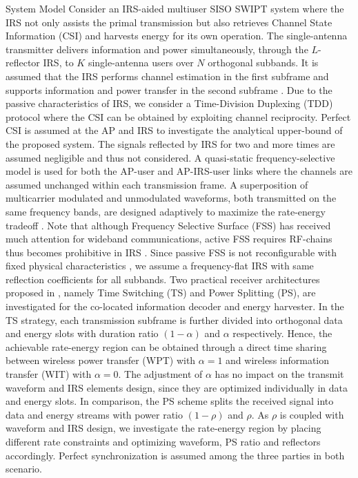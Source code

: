 \documentclass{IEEEtran}
\begin{document}
\begin{section}{System Model}
	Consider an IRS-aided multiuser SISO SWIPT system where the IRS not only assists the primal transmission but also retrieves Channel State Information (CSI) and harvests energy for its own operation. The single-antenna transmitter delivers information and power simultaneously, through the $L$-reflector IRS, to $K$ single-antenna users over $N$ orthogonal subbands. It is assumed that the IRS performs channel estimation in the first subframe and supports information and power transfer in the second subframe \cite{Zheng2019}. Due to the passive characteristics of IRS, we consider a Time-Division Duplexing (TDD) protocol where the CSI can be obtained by exploiting channel reciprocity. Perfect CSI is assumed at the AP and IRS to investigate the analytical upper-bound of the proposed system. The signals reflected by IRS for two and more times are assumed negligible and thus not considered. A quasi-static frequency-selective model is used for both the AP-user and AP-IRS-user links where the channels are assumed unchanged within each transmission frame. A superposition of multicarrier modulated and unmodulated waveforms, both transmitted on the same frequency bands, are designed adaptively to maximize the rate-energy tradeoff \cite{Clerckx2018b}. Note that although Frequency Selective Surface (FSS) has received much attention for wideband communications, active FSS requires RF-chains thus becomes prohibitive in IRS \cite{Kim2006,Xu2014}. Since passive FSS is not reconfigurable with fixed physical characteristics \cite{Anwar2018}, we assume a frequency-flat IRS with same reflection coefficients for all subbands. Two practical receiver architectures proposed in \cite{Zhang2013}, namely Time Switching (TS) and Power Splitting (PS), are investigated for the co-located information decoder and energy harvester. In the TS strategy, each transmission subframe is further divided into orthogonal data and energy slots with duration ratio $(1-\alpha)$ and $\alpha$ respectively. Hence, the achievable rate-energy region can be obtained through a direct time sharing between wireless power transfer (WPT) with $\alpha=1$ and wireless information transfer (WIT) with $\alpha=0$. The adjustment of $\alpha$ has no impact on the transmit waveform and IRS elements design, since they are optimized individually in data and energy slots. In comparison, the PS scheme splits the received signal into data and energy streams with power ratio $(1-\rho)$ and $\rho$. As $\rho$ is coupled with waveform and IRS design, we investigate the rate-energy region by placing different rate constraints and optimizing waveform, PS ratio and reflectors accordingly. Perfect synchronization is assumed among the three parties in both scenario.


\end{section}
\end{document}
